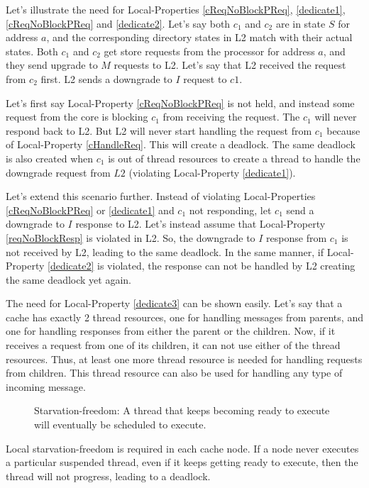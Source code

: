 Let's illustrate the need for Local-Properties \ref{cReqNoBlockPReq},
\ref{dedicate1}, \ref{cReqNoBlockPReq} and \ref{dedicate2}. Let's say both $c_1$
and $c_2$ are in state $S$ for address $a$, and the corresponding directory
states in L2 match with their actual states. Both $c_1$ and $c_2$ get store
requests from the processor for address $a$, and they send upgrade to $M$
requests to L2. Let's say that L2 received the request from $c_2$ first.  L2
sends a downgrade to $I$ request to $c1$.

Let's first say Local-Property \ref{cReqNoBlockPReq} is not held, and instead some
request from the core is blocking $c_1$ from receiving the request. The $c_1$
will never respond back to L2. But L2 will never start handling the request from
$c_1$ because of Local-Property \ref{cHandleReq}. This will create a deadlock.
The same deadlock is also created when $c_1$ is out of thread resources to
create a thread to handle the downgrade request from $L2$ (violating Local-Property
\ref{dedicate1}).%

Let's extend this scenario further. Instead of violating Local-Properties
\ref{cReqNoBlockPReq} or \ref{dedicate1} and $c_1$ not responding, let $c_1$
send a downgrade to $I$ response to L2. Let's instead assume that Local-Property
\ref{reqNoBlockResp} is violated in L2. So, the downgrade to $I$ response from
$c_1$ is not received by L2, leading to the same deadlock. In the same
manner, if Local-Property \ref{dedicate2} is violated, the response can not be
handled by L2 creating the same deadlock yet again.

The need for Local-Property \ref{dedicate3} can be shown easily. Let's say that a
cache has exactly 2 thread resources, one for handling messages from parents,
and one for handling responses from either the parent or the children. Now, if
it receives a request from one of its children, it can not use either of the
thread resources. Thus, at least one more thread resource is needed for
handling requests from children. This thread resource can also be used for
handling any type of incoming message.

\begin{figure}\small
\begin{inv}
Starvation-freedom: A thread that keeps becoming ready to execute will
eventually be scheduled to execute.\label{starvation}
\end{inv}
\end{figure}

Local starvation-freedom is required in each cache node. If a node never
executes a particular suspended thread, even if it keeps getting ready to
execute, then the thread will not progress, leading to a deadlock.
